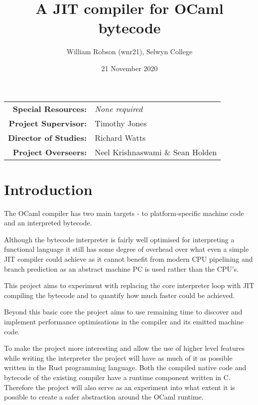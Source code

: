 \documentclass[12pt,a4paper, headings=standardclasses]{scrartcl}
\begin{document}
\title{A JIT compiler for OCaml bytecode}
\author{William Robson (wnr21), Selwyn College}
\date{21 November 2020}

\maketitle

\begin{center}
\begin{tabular}{rl}
    \textbf{Special Resources:} & \textit{None required} \\
    \textbf{Project Supervisor:} & Timothy Jones \\
    \textbf{Director of Studies:} & Richard Watts \\
    \textbf{Project Overseers:} & Neel Krishnaswami \& Sean Holden \\
\end{tabular}
\end{center}

\vspace{2cm}

\section*{Introduction}

The OCaml compiler has two main targets - to platform-specific machine code
and an interpreted bytecode.

Although the bytecode interpreter is fairly well optimised for interpreting a
functional language it still has some degree of overhead over what even a
simple JIT compiler could achieve as it cannot benefit from modern CPU
pipelining and branch prediction as an abstract machine PC is used rather than
the CPU's.

This project aims to experiment with replacing the core interpreter loop with
JIT compiling the bytecode and to quantify how much faster could be achieved.

Beyond this basic core the project aims to use remaining time to discover and
implement performance optimisations in the compiler and its emitted machine
code.

To make the project more interesting and allow the use of higher level
features while writing the interpreter the project will have as much of it as
possible written in the Rust programming language. Both the compiled native
code and bytecode of the existing compiler have a runtime component written
in C. Therefore the project will also serve as an experiment into what extent
it is possible to create a safer abstraction around the OCaml runtime.
\end{document}

